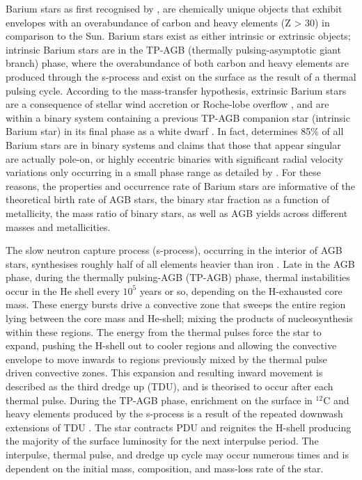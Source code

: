 \documentclass[a4paper,fleqn,usenatbib]{mnras}
\begin{document}
Barium stars as first recognised by \citet{Bidelman1951}, are chemically unique objects that exhibit envelopes with an overabundance of carbon and heavy elements (Z > 30) in comparison to the Sun. Barium stars exist as either intrinsic or extrinsic objects; intrinsic Barium stars are in the TP-AGB (thermally pulsing-asymptotic giant branch) phase, where the overabundance of both carbon and heavy elements are produced through the s-process and exist on the surface as the result of a thermal pulsing cycle. According to the mass-transfer hypothesis, extrinsic Barium stars are a consequence of stellar wind accretion \citep{boffin1988,jorissen1992} or Roche-lobe overflow \citep{webbink1986}, and are within a binary system containing a previous TP-AGB companion star (intrinsic Barium star) in its final phase as a white dwarf \citep{bohm1980,bohm1984}. In fact, \citet{mcclure1983} determines 85\% of all Barium stars are in binary systems and claims that those that appear singular are actually pole-on, or highly eccentric binaries with significant radial velocity variations only occurring in a small phase range as detailed by \citet{pourbaix2004}. For these reasons, the properties and occurrence rate of Barium stars are informative of the theoretical birth rate of AGB stars, the binary star fraction as a function of metallicity, the mass ratio of binary stars, as well as AGB yields across different masses and metallicities. 

The slow neutron capture process (s-process), occurring in the interior of AGB stars, synthesises roughly half of all elements heavier than iron \citep[e.g.][]{busso1999,travaglio2001,herwig2005,romano2010,kobayashi2011,prantzos2012,bisterzo2014,karakas12016}. Late in the AGB phase, during the thermally pulsing-AGB (TP-AGB) phase, thermal instabilities occur in the He shell every $10^5$ years or so, depending on the H-exhausted core mass. These energy bursts drive a convective zone that sweeps the entire region lying between the core mass and He-shell; mixing the products of nucleosynthesis within these regions. The energy from the thermal pulses force the star to expand, pushing the H-shell out to cooler regions and allowing the convective envelope to move inwards to regions previously mixed by the thermal pulse driven convective zones. This expansion and resulting inward movement is described as the third dredge up (TDU), and is theorised to occur after each thermal pulse. During the TP-AGB phase, enrichment on the surface in $^{12}$C and heavy elements produced by the s-process is a result of the repeated downwash extensions of TDU \citep[e.g.][]{busso2001}. The star contracts PDU and reignites the H-shell producing the majority of the surface luminosity for the next interpulse period. The interpulse, thermal pulse, and dredge up cycle may occur numerous times and is dependent on the initial mass, composition, and mass-loss rate of the star.
\end{document}
